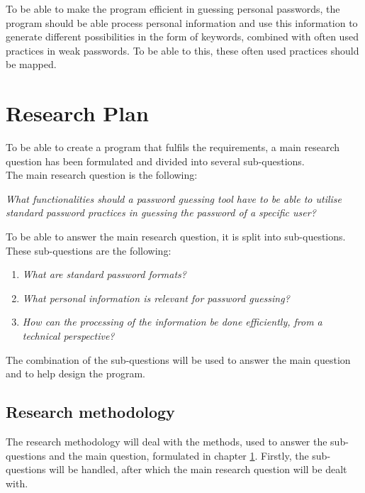 \documentclass[a4paper,12pt]{article}
\begin{document}
To be able to make the program efficient in guessing personal passwords, the program should be able process personal information and use this information to generate different possibilities in the form of keywords, combined with often used practices in weak passwords. To be able to this, these often used practices should be mapped.

\newpage
\section{Research Plan}
\label{ch:rp}
To be able to create a program that fulfils the requirements, a main research question has been formulated and divided into several sub-questions.\\

The main research question is the following:

\vspace{0.3cm}
\textit{What functionalities should a password guessing tool have to be able to utilise standard password practices in guessing the password of a specific user?}
\vspace{0.3cm}

To be able to answer the main research question, it is split into sub-questions. These sub-questions are the following:

\vspace{0.3cm}
\begin{enumerate}
\item \textit{What are standard password formats?}
\item \textit{What personal information is relevant for password guessing?}
\item \textit{How can the processing of the information be done efficiently, from a technical perspective?}
\end{enumerate}
\vspace{0.3cm}

The combination of the sub-questions will be used to answer the main question and to help design the program.

\subsection{Research methodology}
The research methodology will deal with the methods, used to answer the sub-questions and the main question, formulated in chapter \ref{ch:rp}. Firstly, the sub-questions will be handled, after which the main research question will be dealt with.
\end{document}
